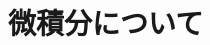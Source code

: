 \documentclass[unicode,12pt,aspectratio=169]{beamer}
\begin{document}

	

\section{微積分について}
\end{document}
